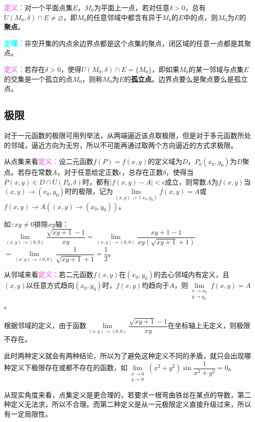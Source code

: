 \textcolor{violet}{\textbf{定义：}}对一个平面点集$E$，$M_0$为平面上一点，若对任意$\delta>0$，总有$\mathring{U}(M_0,\delta)\cap E\neq\varnothing$，即$M_0$的任意邻域中都含有异于$M_0$的$E$中的点，则$M_0$为$E$的\textbf{聚点}。

\textcolor{aqua}{\textbf{定理：}}非空开集的内点余边界点都是这个点集的聚点，闭区域的任意一点都是其聚点。

\textcolor{violet}{\textbf{定义：}}若存在$\delta>0$，使得$U(M_0,\delta)\cap E=\{M_0\}$，即如果$M_0$的某一邻域与点集$E$的交集是一个孤立的点$M_0$，则称$M_0$为$E$的\textbf{孤立点}。边界点要么是聚点要么是孤立点。

\subsection{极限}

对于一元函数的极限可用列举法，从两端逼近该点取极限，但是对于多元函数所处的邻域，逼近方向为无穷，所以不可能再通过取两个方向逼近的方式求极限。

从点集来看\textcolor{violet}{\textbf{定义：}}设二元函数$f(P)=f(x,y)$的定义域为$D$，$P_0(x_0,y_0)$为$D$聚点。若存在常数$A$，对于任意给定正数$\epsilon$，总存在正数$\delta$，使得当$P(x,y)\in D\cap\mathring{U}(P_0,\delta)$时，都有$\vert f(x,y)-A\vert<\epsilon$成立，则常数$A$为$f(x,y)$当$(x,y)\rightarrow(x_0,y_0)$时的极限，记为$\lim\limits_{(x,y)\to(x_0,y_0)}f(x,y)=A$或$f(x,y)\to A((x,y)\to(x_0,y_0))$。

如$\because xy\neq0$排除$xy$轴：$\lim\limits_{(x,y)\to(0,0)}\dfrac{\sqrt{xy+1}-1}{xy}=\lim\limits_{(x,y)\to(0,0)}\dfrac{xy+1-1}{xy(\sqrt{xy+1}+1)}$\\$=\lim\limits_{(x,y)\to(0,0)}\dfrac{1}{\sqrt{xy+1}+1}=\dfrac{1}{2}$。\medskip

从邻域来看\textcolor{violet}{\textbf{定义：}}若二元函数$f(x,y)$在$(x_0,y_0)$的去心邻域内有定义，且$(x,y)$以任意方式趋向$(x_0,y_0)$时，$f(x,y)$均趋向于$A$，则$\lim\limits_{\substack{x\to x_0\\y\to y_0}}f(x,y)=A$。

根据邻域的定义，由于函数$\lim\limits_{(x,y)\to(0,0)}\dfrac{\sqrt{xy+1}-1}{xy}$在坐标轴上无定义，则极限不存在。

此时两种定义就会有两种结论，所以为了避免这种定义不同的矛盾，就只会出现哪种定义下极限存在或都不存在的函数，如$\lim\limits_{\substack{x\to0\\y\to0}}(x^2+y^2)\sin\dfrac{1}{x^2+y^2}=0$。

从现实角度来看，点集定义是更合理的，若要求一根弯曲铁丝在某点的导数，第二种定义无法求，所以不合理。而第二种定义是从一元极限定义直接升级过来，所以有一定局限性。


